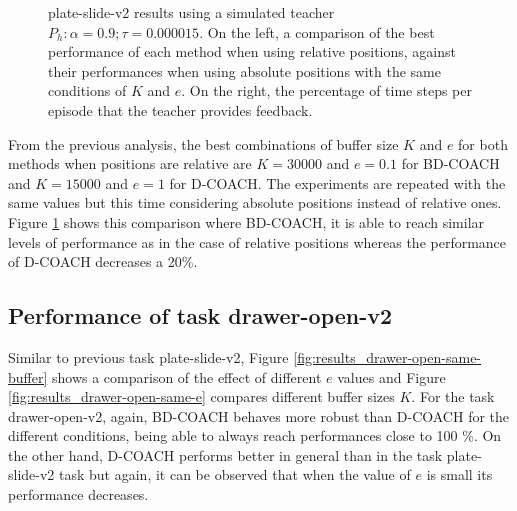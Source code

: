  \begin{figure}[H]
  \centering
  \caption{plate-slide-v2 results using a simulated teacher $P_h: \alpha = 0.9; \tau =  0.000015$. On the left, a comparison of the best performance of each method when using relative positions, against their performances when using absolute positions with the same conditions of $K$ and $e$. On the right, the percentage of time steps per episode that the teacher  provides feedback.}
  \label{fig:results-plate-slide-best}
\end{figure}











      
From the previous analysis, the best combinations of buffer size $K$ and $e$ for both methods when positions are relative are $K=30000$ and $e=0.1$ for BD-COACH and $K=15000$ and $e=1$ for D-COACH. The experiments are repeated with the same values but this time considering absolute positions instead of relative ones. Figure \ref{fig:results-plate-slide-best} shows this comparison where BD-COACH, it is able to reach similar levels of performance as in the case of relative positions whereas the performance of D-COACH decreases a 20\%.


\subsection{Performance of task drawer-open-v2}
\label{subsection:Performance of task drawer_open_v2}




Similar to previous task plate-slide-v2, Figure \ref{fig:results_drawer-open-same-buffer} shows a comparison of the effect of different $e$ values and Figure \ref{fig:results_drawer-open-same-e} compares different buffer sizes $K$. For the task drawer-open-v2, again, BD-COACH behaves more robust than D-COACH for the different conditions, being able to always reach performances close to 100 \%. On the other hand, D-COACH performs better in general than in the task plate-slide-v2 task but again, it can be observed that when the value of $e$ is small its performance decreases.



